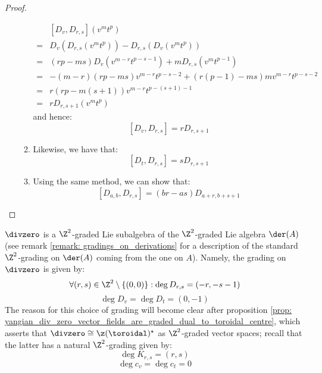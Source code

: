 \begin{proof}
\begin{enumerate}
\begin{enumerate}
                            $$
                                \begin{aligned}
                                    & [D_v, D_{r, s}](v^m t^p)
                                    \\
                                    = & D_v( D_{r, s}(v^m t^p) ) - D_{r, s}( D_v(v^m t^p) )
                                    \\
                                    = & (rp - ms) D_v( v^{m - r} t^{p - s - 1} ) + m D_{r, s}( v^m t^{p - 1} )
                                    \\
                                    = & -(m - r)(rp - ms) v^{m - r} t^{p - s - 2} + (r(p - 1) - ms) m v^{m - r} t^{p - s - 2}
                                    \\
                                    = & r(rp - m(s + 1)) v^{m - r} t^{p - (s + 1) - 1}
                                    \\
                                    = & r D_{r, s + 1}(v^m t^p)
                                \end{aligned}
                            $$
                        and hence:
                            $$[D_v, D_{r, s}] = r D_{r, s + 1}$$
                        \item Likewise, we have that:
                            $$[D_t, D_{r, s}] = s D_{r, s + 1}$$
                        \item Using the same method, we can show that:
                            $$[D_{a, b}, D_{r, s}] = (br - as) D_{a + r, b + s + 1}$$
                    \end{enumerate}
                \end{enumerate}
            \end{proof}
        \begin{corollary} \label{coro: yangian_div_zero_vector_fields_are_graded}
            $\divzero$ is a $\Z^2$-graded Lie subalgebra of the $\Z^2$-graded Lie algebra $\der(A)$ (see remark \ref{remark: gradings_on_derivations} for a description of the standard $\Z^2$-grading on $\der(A)$ coming from the one on $A$). Namely, the grading on $\divzero$ is given by:
                $$\forall (r, s) \in \Z^2 \setminus \{(0, 0)\}: \deg D_{r, s} = (-r, -s - 1)$$
                $$\deg D_v = \deg D_t = (0, -1)$$
            The reason for this choice of grading will become clear after proposition \ref{prop: yangian_div_zero_vector_fields_are_graded_dual_to_toroidal_centre}, which asserts that $\divzero \cong \z(\toroidal)^{\star}$ as $\Z^2$-graded vector spaces; recall that the latter has a natural $\Z^2$-grading given by:
                $$\deg K_{r, s} = (r, s)$$
                $$\deg c_v = \deg c_t = 0$$
        \end{corollary}

